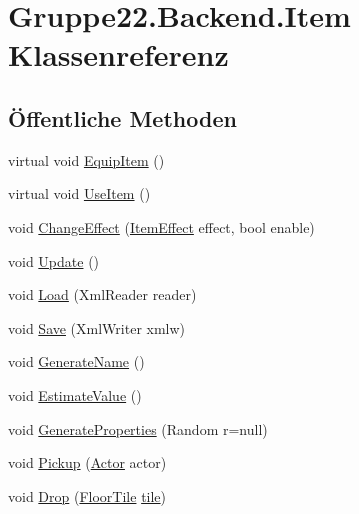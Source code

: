 \hypertarget{class_gruppe22_1_1_backend_1_1_item}{\section{Gruppe22.\-Backend.\-Item Klassenreferenz}
\label{class_gruppe22_1_1_backend_1_1_item}
}
\subsection*{Öffentliche Methoden}
\begin{DoxyCompactItemize}
\item 
virtual void \hyperlink{class_gruppe22_1_1_backend_1_1_item_a1f5cf108b31805827e61e3b258aec89a}{Equip\-Item} ()
\item 
virtual void \hyperlink{class_gruppe22_1_1_backend_1_1_item_af52b17ce2c48fadc508be98736993ad6}{Use\-Item} ()
\item 
void \hyperlink{class_gruppe22_1_1_backend_1_1_item_a884f05467df8e7171200873e3e77bee7}{Change\-Effect} (\hyperlink{class_gruppe22_1_1_backend_1_1_item_effect}{Item\-Effect} effect, bool enable)
\item 
void \hyperlink{class_gruppe22_1_1_backend_1_1_item_a0d64ac455259d3591a828979af8fc037}{Update} ()
\item 
void \hyperlink{class_gruppe22_1_1_backend_1_1_item_a45803de46f6e258be265a0cca5ddacfe}{Load} (Xml\-Reader reader)
\item 
void \hyperlink{class_gruppe22_1_1_backend_1_1_item_a9da5fe24ef57badc1d8ffa8ef41e0bdc}{Save} (Xml\-Writer xmlw)
\item 
void \hyperlink{class_gruppe22_1_1_backend_1_1_item_ae74b65ee3382bc05071469029de80864}{Generate\-Name} ()
\item 
void \hyperlink{class_gruppe22_1_1_backend_1_1_item_a0463c9e08133140294194c091b8939ea}{Estimate\-Value} ()
\item 
void \hyperlink{class_gruppe22_1_1_backend_1_1_item_a8f022dad2e31a84323153f736bf38408}{Generate\-Properties} (Random r=null)
\item 
void \hyperlink{class_gruppe22_1_1_backend_1_1_item_a1e4c5e9ec67f41f945c29734c9b383ba}{Pickup} (\hyperlink{class_gruppe22_1_1_backend_1_1_actor}{Actor} actor)
\item 
void \hyperlink{class_gruppe22_1_1_backend_1_1_item_af0ab1ef5abcf45ffe94fcb1e714c4918}{Drop} (\hyperlink{class_gruppe22_1_1_backend_1_1_floor_tile}{Floor\-Tile} \hyperlink{class_gruppe22_1_1_backend_1_1_item_ad982ec382c07e05bf4cd77c4643fc076}{tile})

\end{DoxyCompactItemize}
